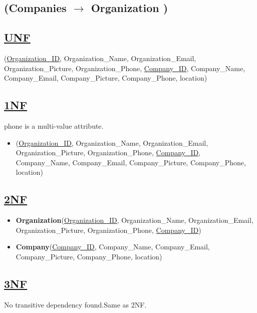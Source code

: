 \subsection{\texorpdfstring{\centering (Companies $\rightarrow$ Organization )}{ (Companies - Organization )}}

\subsection*{\underline{UNF}}

(\underline{Organization\_ID}, Organization\_Name, Organization\_Email, Organization\_Picture, Organization\_Phone, \underline{Company\_ID}, Company\_Name, Company\_Email, Company\_Picture, Company\_Phone, location)

\subsection*{\underline{1NF}}
phone is a multi-value attribute.

\begin{itemize}
    \item (\underline{Organization\_ID}, Organization\_Name, Organization\_Email, Organization\_Picture, Organization\_Phone, \underline{Company\_ID}, Company\_Name, Company\_Email, Company\_Picture, Company\_Phone, location)
\end{itemize}

\subsection*{\underline{2NF}}
\begin{itemize}
    \item \textbf{Organization}(\underline{Organization\_ID}, Organization\_Name, Organization\_Email, Organization\_Picture, Organization\_Phone, \underline{Company\_ID})
    \item \textbf{Company}(\underline{Company\_ID}, Company\_Name, Company\_Email, Company\_Picture, Company\_Phone, location)
\end{itemize}

\subsection*{\underline{3NF}}
No transitive dependency found.Same as 2NF.

